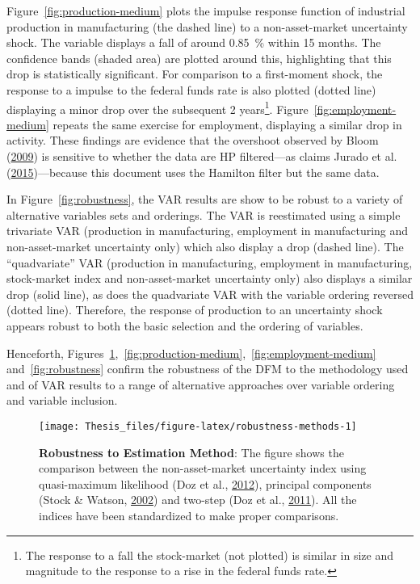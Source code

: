 \documentclass[12pt,twoside]{reedthesis}
\begin{document}
Figure~\ref{fig:production-medium} plots the impulse response function of industrial production in manufacturing (the dashed line) to a non-asset-market uncertainty shock. The variable displays a fall of around 0.85~\% within 15 months. The confidence bands (shaded area) are plotted around this, highlighting that this drop is statistically significant. For comparison to a first-moment shock, the response to a impulse to the federal funds rate is also plotted (dotted line) displaying a minor drop over the subsequent 2 years\footnote{The response to a fall the stock-market (not plotted) is similar in size and magnitude to the response to a rise in the federal funds rate.}. Figure~\ref{fig:employment-medium} repeats the same exercise for employment, displaying a similar drop in activity. These findings are evidence that the overshoot observed by Bloom (\protect\hyperlink{ref-bloom:2009}{2009}) is sensitive to whether the data are HP filtered---as claims Jurado et al. (\protect\hyperlink{ref-juraetal:2015}{2015})---because this document uses the Hamilton filter but the same data.

In Figure~\ref{fig:robustness}, the VAR results are show to be robust to a variety of alternative variables sets and orderings. The VAR is reestimated using a simple trivariate VAR (production in manufacturing, employment in manufacturing and non-asset-market uncertainty only) which also display a drop (dashed line). The ``quadvariate'' VAR (production in manufacturing, employment in manufacturing, stock-market index and non-asset-market uncertainty only) also displays a similar drop (solid line), as does the quadvariate VAR with the variable ordering reversed (dotted line). Therefore, the response of production to an uncertainty shock appears robust to both the basic selection and the ordering of variables.

Henceforth, Figures~\ref{fig:robustness-methods},~\ref{fig:production-medium},~\ref{fig:employment-medium} and~\ref{fig:robustness} confirm the robustness of the DFM to the methodology used and of VAR results to a range of alternative approaches over variable ordering and variable inclusion.


\begin{figure}

{\centering \texttt{[image: Thesis\_files/figure-latex/robustness-methods-1]} 

}

\caption[Robustness to Estimation Method]{\textbf{Robustness to Estimation Method}: The figure shows the comparison between the non-asset-market uncertainty index using quasi-maximum likelihood (Doz et al., \protect\hyperlink{ref-dozetal:2012}{2012}), principal components (Stock \& Watson, \protect\hyperlink{ref-stocwats:2002}{2002}) and two-step (Doz et al., \protect\hyperlink{ref-dozetal:2011}{2011}). All the indices have been standardized to make proper comparisons.}\label{fig:robustness-methods}
\end{figure}
\end{document}

